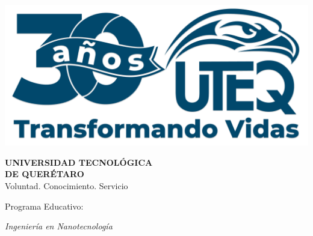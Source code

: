 \documentclass[12pt,a4paper]{article}
\begin{document}
	
	\begin{titlepage}
		\begin{center}
			
			
			\vspace{1cm}
			
			\begin{minipage}{0.3\textwidth}
				\includegraphics[width=\textwidth]{Figuras/LogoUTEQ}
			\end{minipage}
			\hfill
			\begin{minipage}{0.65\textwidth}
				\raggedleft
				{\fontsize{20}{24}\selectfont\textcolor{uteqDarkBlue}{\textbf{UNIVERSIDAD TECNOLÓGICA}}} \\
				{\fontsize{20}{24}\selectfont\textcolor{uteqDarkBlue}{\textbf{DE QUERÉTARO}}} \\
				\vspace{0.2cm}
				{\fontsize{10}{12}\selectfont\textcolor{uteqGreen}{Voluntad. Conocimiento. Servicio}}
			\end{minipage}
			
			\vspace{3.5cm}
			
			
			\vspace{0.5cm}
			
			{\Large\textcolor{uteqDarkBlue}{Programa Educativo:}}
			
			\vspace{0.5cm}
			{\Large\textit{Ingeniería en Nanotecnología}}
			

\end{center}
\end{titlepage}
\end{document}
